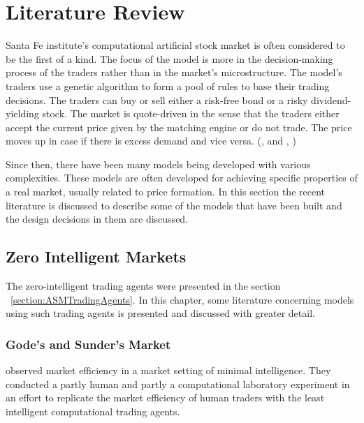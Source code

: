\section{Literature Review}

Santa Fe institute's computational artificial stock 
market is often considered to be the first of a kind. 
The focus of the model is more in the 
decision-making process of the traders rather than in the 
market's microstructure. The model's traders use a 
genetic algorithm to form a pool of rules to base
their trading decisions. The traders can buy or
sell either a risk-free bond or a risky dividend-yielding stock.
The market is quote-driven in the sense that the traders
either accept the current price given by the matching engine
or do not trade. The price moves up in case if there is excess
demand and vice versa. (\citeauthor{SantaFe94}, \citeyear{SantaFe94} 
and \citeauthor{SantaFe99}, \citeyear{SantaFe99})

Since then, there have been many models being 
developed with various complexities. These models are often developed
for achieving specific properties of a real market, 
usually related to price formation. In this section
the recent literature is discussed to describe some of the models 
that have been built and the design decisions in them are discussed.


\subsection{Zero Intelligent Markets}


The zero-intelligent trading agents were presented in the section 
~\ref{section:ASMTradingAgents}. In this chapter, some literature concerning 
models using such trading agents is presented and discussed with greater detail.

\subsubsection{Gode's and Sunder's Market}
\citet{God93} observed market efficiency in a market setting
of minimal intelligence. They conducted a partly human and partly
a computational laboratory experiment in an effort to replicate the market
efficiency of human traders with the least intelligent computational
trading agents.

